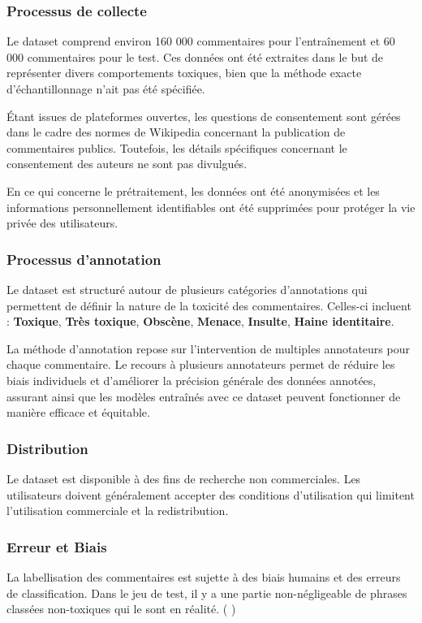 \newpage
\subsubsection*{Processus de collecte}
Le dataset comprend environ 160 000 commentaires pour l'entraînement et 60 000 commentaires pour le test. Ces données ont été extraites dans le but de représenter divers comportements toxiques, bien que la méthode exacte d'échantillonnage n'ait pas été spécifiée. 

Étant issues de plateformes ouvertes, les questions de consentement sont gérées dans le cadre des normes de Wikipedia concernant la publication de commentaires publics. Toutefois, les détails spécifiques concernant le consentement des auteurs ne sont pas divulgués.

En ce qui concerne le prétraitement, les données ont été anonymisées et les informations personnellement identifiables ont été supprimées pour protéger la vie privée des utilisateurs. 

\subsubsection*{Processus d'annotation}
Le dataset est structuré autour de plusieurs catégories d'annotations qui permettent de définir la nature de la toxicité des commentaires. 
Celles-ci incluent :
\textbf{Toxique},
\textbf{Très toxique},
\textbf{Obscène},
\textbf{Menace},
\textbf{Insulte},
\textbf{Haine identitaire}.

La méthode d'annotation repose sur l'intervention de multiples annotateurs pour chaque commentaire.
Le recours à plusieurs annotateurs permet de réduire les biais individuels et d'améliorer la précision générale des données annotées, assurant ainsi que les modèles entraînés avec ce dataset peuvent fonctionner de manière efficace et équitable.

\subsubsection*{Distribution}
Le dataset est disponible à des fins de recherche non commerciales. Les utilisateurs doivent généralement accepter des conditions d'utilisation qui limitent l'utilisation commerciale et la redistribution.

\subsubsection*{Erreur et Biais}
La labellisation des commentaires est sujette à des biais humains et des erreurs de classification. 
Dans le jeu de test, il y a une partie non-négligeable de phrases classées non-toxiques qui le sont en réalité. (\cite{DBLP:journals/corr/abs-1809-07572} )
